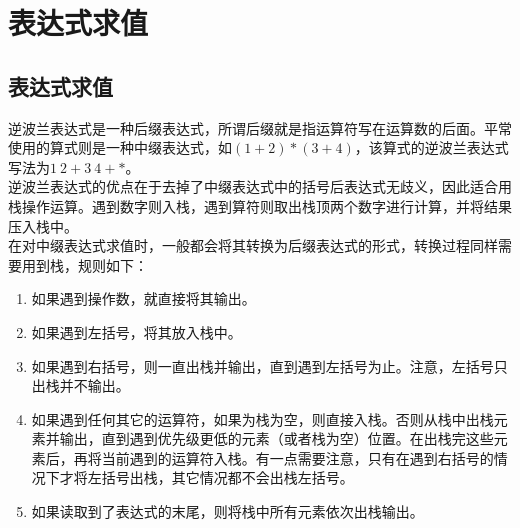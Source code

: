 \newpage

\section{表达式求值}

\subsection{表达式求值}

逆波兰表达式是一种后缀表达式，所谓后缀就是指运算符写在运算数的后面。平常使用的算式则是一种中缀表达式，如$ (1 + 2) * (3 + 4) $，该算式的逆波兰表达式写法为$ 1\ 2 + 3\ 4 + * $。 \\

逆波兰表达式的优点在于去掉了中缀表达式中的括号后表达式无歧义，因此适合用栈操作运算。遇到数字则入栈，遇到算符则取出栈顶两个数字进行计算，并将结果压入栈中。 \\

在对中缀表达式求值时，一般都会将其转换为后缀表达式的形式，转换过程同样需要用到栈，规则如下：

\begin{enumerate}
    \item 如果遇到操作数，就直接将其输出。

    \item 如果遇到左括号，将其放入栈中。

    \item 如果遇到右括号，则一直出栈并输出，直到遇到左括号为止。注意，左括号只出栈并不输出。

    \item 如果遇到任何其它的运算符，如果为栈为空，则直接入栈。否则从栈中出栈元素并输出，直到遇到优先级更低的元素（或者栈为空）位置。在出栈完这些元素后，再将当前遇到的运算符入栈。有一点需要注意，只有在遇到右括号的情况下才将左括号出栈，其它情况都不会出栈左括号。

    \item 如果读取到了表达式的末尾，则将栈中所有元素依次出栈输出。
\end{enumerate}


